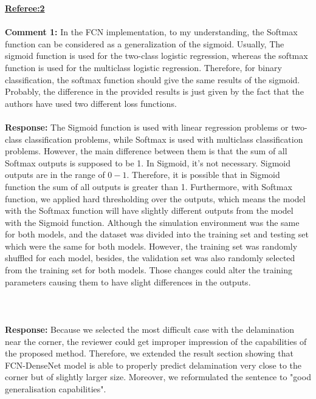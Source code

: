 \documentclass[11pt,a4paper]{article}
\begin{document}
{{{{{{{{{\newpage
\color{black}	
\underline{\textbf{Referee:2}} 	
\\
\\
\textbf{Comment 1:} In the FCN implementation, to my understanding, the Softmax function can be considered as a generalization of the sigmoid. Usually, The sigmoid function is used for the two-class logistic regression, whereas the softmax function is used for the multiclass logistic regression.
Therefore, for binary classification, the softmax function should give the same results of the sigmoid. Probably, the difference in the provided results is just given by the fact that the authors have used two different loss functions.
\\ \\
\color{blue}\textbf{Response:} The Sigmoid function is used with linear regression problems or two-class classification problems,
while Softmax is used with multiclass classification problems. However, the main difference between
them is that the sum of all Softmax outputs is supposed to be 1. In Sigmoid, it's not necessary. Sigmoid outputs
are in the range of \(0-1\). Therefore, it is possible that in Sigmoid function the sum of all outputs is greater than
1. Furthermore, with Softmax function, we applied hard thresholding over the outputs, which means the model
with the Softmax function will have slightly different outputs from the model with the Sigmoid function. Although
the simulation environment was the same for both models, and the dataset was divided into the training
set and testing set which were the same for both models. However, the training set was randomly shuffled for
each model, besides, the validation set was also randomly selected from the training set for both models. Those
changes could alter the training parameters causing them to have slight differences in the outputs.
\\ \\	
\\ \\ 
\color{blue}\textbf{Response:} Because we selected the most difficult case with the delamination near the corner, the reviewer could get improper impression of the capabilities of the proposed method. Therefore, we extended the result section showing that FCN-DenseNet model is able to properly predict delamination very close to the corner but of slightly larger size. Moreover, we reformulated the sentence to "good generalisation capabilities". 

}}}}}}}}}
\end{document}
